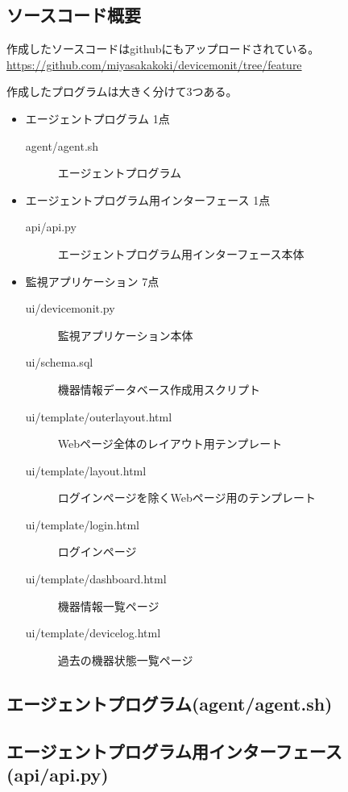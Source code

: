 \subsection{ソースコード概要}
作成したソースコードはgithubにもアップロードされている。
\url{https://github.com/miyasakakoki/devicemonit/tree/feature}

作成したプログラムは大きく分けて3つある。
\begin{itemize}
\item エージェントプログラム 1点\\
	\begin{description}
		\item[agent/agent.sh] エージェントプログラム
	\end{description}
\item エージェントプログラム用インターフェース 1点\\
	\begin{description}
		\item[api/api.py] エージェントプログラム用インターフェース本体
	\end{description}
\item 監視アプリケーション 7点\\
	\begin{description}
		\item[ui/devicemonit.py] 監視アプリケーション本体
		\item[ui/schema.sql] 機器情報データベース作成用スクリプト
		\item[ui/template/outerlayout.html] Webページ全体のレイアウト用テンプレート
		\item[ui/template/layout.html] ログインページを除くWebページ用のテンプレート
		\item[ui/template/login.html] ログインページ
		\item[ui/template/dashboard.html] 機器情報一覧ページ
		\item[ui/template/devicelog.html] 過去の機器状態一覧ページ
	\end{description}
\end{itemize}

\subsection{エージェントプログラム(agent/agent.sh)}

\subsection{エージェントプログラム用インターフェース(api/api.py)}

